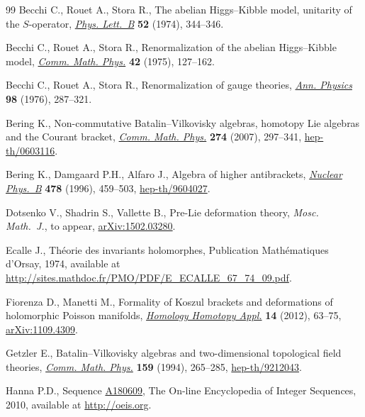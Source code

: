 \documentclass[pdftex]{sigma}
\numberwithin{equation}{section}
\begin{document}
\begin{thebibliography}{99}
Becchi C., Rouet A., Stora R., The abelian {H}iggs--{K}ibble model, unitarity
 of the $S$-operator, \href{http://dx.doi.org/10.1016/0370-2693(74)90058-6}{\textit{Phys. Lett.~B}} \textbf{52} (1974), 344--346.

Becchi C., Rouet A., Stora R., Renormalization of the abelian {H}iggs--{K}ibble
 model, \href{http://dx.doi.org/10.1007/BF01614158}{\textit{Comm. Math. Phys.}} \textbf{42} (1975), 127--162.

Becchi C., Rouet A., Stora R., Renormalization of gauge theories, \href{http://dx.doi.org/10.1016/0003-4916(76)90156-1}{\textit{Ann.
 Physics}} \textbf{98} (1976), 287--321.

Bering K., Non-commutative {B}atalin--{V}ilkovisky algebras, homotopy {L}ie
 algebras and the {C}ourant bracket, \href{http://dx.doi.org/10.1007/s00220-007-0278-3}{\textit{Comm. Math. Phys.}} \textbf{274}
 (2007), 297--341, \href{http://arxiv.org/abs/hep-th/0603116}{hep-th/0603116}.

Bering K., Damgaard P.H., Alfaro J., Algebra of higher antibrackets,
 \href{http://dx.doi.org/10.1016/0550-3213(96)00401-4}{\textit{Nuclear Phys.~B}} \textbf{478} (1996), 459--503,
 \href{http://arxiv.org/abs/hep-th/9604027}{hep-th/9604027}.

Dotsenko V., Shadrin S., Vallette B., Pre-{L}ie deformation theory,
 \textit{Mosc. Math.~J.}, {t}o appear, \href{http://arxiv.org/abs/1502.03280}{arXiv:1502.03280}.

Ecalle J., Th\'eorie des invariants holomorphes, Publication Math\'ematiques
 d'Orsay, 1974, available at \url{http://sites.mathdoc.fr/PMO/PDF/E_ECALLE_67_74_09.pdf}.

Fiorenza D., Manetti M., Formality of {K}oszul brackets and deformations of
 holomorphic {P}oisson manifolds, \href{http://dx.doi.org/10.4310/HHA.2012.v14.n2.a4}{\textit{Homology Homotopy Appl.}} \textbf{14}
 (2012), 63--75, \href{http://arxiv.org/abs/1109.4309}{arXiv:1109.4309}.

Getzler E., Batalin--{V}ilkovisky algebras and two-dimensional topological
 f\/ield theories, \href{http://dx.doi.org/10.1007/BF02102639}{\textit{Comm. Math. Phys.}} \textbf{159} (1994), 265--285,
 \href{http://arxiv.org/abs/hep-th/9212043}{hep-th/9212043}.

Hanna P.D., Sequence \href{http://oeis.org/A180609}{A180609}, {T}he On-line Encyclopedia of
 Integer Sequences, 2010, available at \url{http://oeis.org}.


\end{thebibliography}
\end{document}
